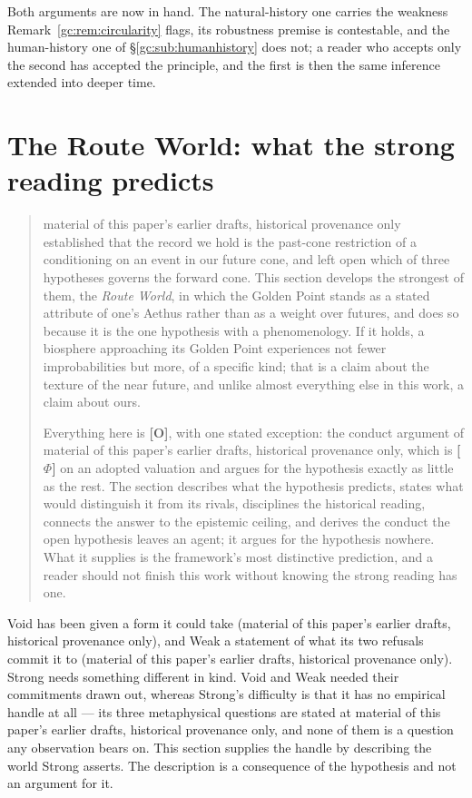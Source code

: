 Both arguments are now in hand. The natural-history one carries the
weakness Remark~\ref{gc:rem:circularity} flags, its robustness
premise is contestable, and the human-history one of
\S\ref{gc:sub:humanhistory} does not; a reader who accepts only the
second has accepted the principle, and the first is then the same
inference extended into deeper time.


\section{The Route World: what the strong reading predicts}\label{sec:routeworld}\label{gc:subsub:routeworld}\label{rw:sec}

\begin{quote}\small
material of this paper's earlier drafts, historical provenance only established that the record we hold is the past-cone
restriction of a conditioning on an event in our future cone, and left
open which of three hypotheses governs the forward cone. This section
develops the strongest of them, the \emph{Route World}, in which the
Golden Point stands as a stated attribute of one's Aethus rather than as
a weight over futures, and does so because it is the one hypothesis
with a phenomenology. If it holds, a biosphere approaching its Golden
Point experiences not fewer improbabilities but more, of a specific kind;
that is a claim about the texture of the near future, and unlike almost
everything else in this work, a claim about ours.

Everything here is \textbf{[O]}, with one stated exception: the
conduct argument of material of this paper's earlier drafts, historical provenance only, which is
\textbf{[$\Phi$]} on an adopted valuation and argues for the
hypothesis exactly as little as the rest. The section describes what
the hypothesis predicts, states what would distinguish it from its
rivals, disciplines the historical reading, connects the answer to the
epistemic ceiling, and derives the conduct the open hypothesis leaves
an agent; it argues for the hypothesis nowhere. What it supplies is the framework's most distinctive
prediction, and a reader should not finish this work without knowing the
strong reading has one.
\end{quote}

Void has been given a form it could take
(material of this paper's earlier drafts, historical provenance only), and Weak a statement of what its two
refusals commit it to (material of this paper's earlier drafts, historical provenance only). Strong needs
something different in kind. Void and Weak needed their commitments
drawn out, whereas Strong's difficulty is that it has no empirical handle
at all --- its three metaphysical questions are stated at
material of this paper's earlier drafts, historical provenance only, and none of them is a question any
observation bears on. This section supplies the handle by describing the
world Strong asserts. The description is a consequence of the hypothesis
and not an argument for it.

